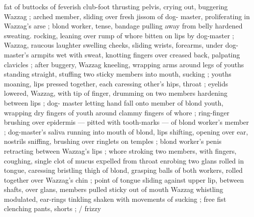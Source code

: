 fat of buttocks of feverish club-foot {\dashcom} thrusting pelvis, crying out, 
buggering Wazzag ; arched member, sliding over fresh jissom of dog- 
master, proliferating in Wazzag's arse ; blond worker, tense, bandage 
pulling away from belly hardened sweating. rocking, leaning over 
rump of whore bitten on lips by dog-master ; Wazzag, raucous 
laughter swelling cheeks, sliding wrists, forearms, under dog- 
master's armpits wet with sweat, knotting fingers over creased back, 
palpating clavicles ; after buggery, Wazzag kneeling, wrapping arms 
around legs of youths standing straight, stuffing two sticky members 
into mouth, sucking ; youths moaning, lips pressed together, each 
caressing other's hips, throat ; eyelids lowered, Wazzag, with tip of 
finger, drumming on two members hardening between lips ; dog- 
master letting hand fall onto member of blond youth, wrapping dry 
fingers of youth around clammy fingers of whore ; ring-finger 
brushing over epidermis --- pitted with tooth-marks --- of blond 
worker's member ; dog-master's saliva running into mouth of blond, 
lips shifting, opening over ear, nostrils sniffing, brushing over 
ringlets on temples  ;
blond worker's penis retracting between Wazzag's lips ; whore 
stroking two members, with fingers, coughing, single clot of mucus 
expelled from throat enrobing two glans rolled in tongue, caressing 
bristling thigh of blond, grasping balls of both workers, rolled 
together over Wazzag's chin ; point of tongue sliding against upper 
lip, between shafts, over glans, members pulled sticky out of mouth 
Wazzag whistling modulated, ear-rings tinkling shaken with 
movements of sucking ; free fist clenching pants, shorts ; {\slash} frizzy 
